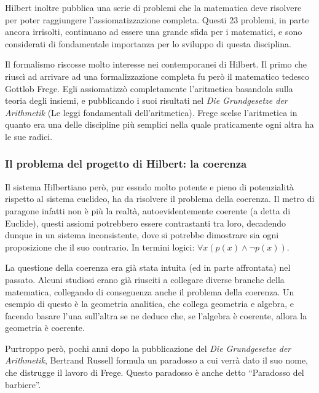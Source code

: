 \documentclass[a4paper,10pt]{article}
\begin{document}
Hilbert inoltre pubblica una serie di problemi che la matematica deve risolvere per poter raggiungere l'assiomatizzazione completa. Questi 23 problemi, in parte ancora irrisolti, continuano ad essere una grande sfida per i matematici, e sono considerati di fondamentale importanza per lo sviluppo di questa disciplina.

Il formalismo riscosse molto interesse nei contemporanei di Hilbert. Il primo che riuscì ad arrivare ad una formalizzazione completa fu però il matematico tedesco Gottlob Frege. Egli assiomatizzò completamente l'aritmetica basandola sulla teoria degli insiemi, e pubblicando i suoi risultati nel \textit{Die Grundgesetze der Arithmetik} (Le leggi fondamentali dell'aritmetica). Frege scelse l'aritmetica in quanto era una delle discipline più semplici nella quale praticamente ogni altra ha le sue radici.

\subsubsection[Il problema coerenza]{Il problema del progetto di Hilbert: la coerenza}
Il sistema Hilbertiano però, pur essndo molto potente e pieno di potenzialità rispetto al sistema euclideo, ha da risolvere il problema della coerenza. Il metro di paragone infatti non è più la realtà, autoevidentemente coerente (a detta di Euclide), questi assiomi potrebbero essere contrastanti tra loro, decadendo dunque in un sistema inconsistente, dove si potrebbe dimostrare sia ogni proposizione che il suo contrario. In termini logici: $ \forall x (p(x)\wedge\neg p(x))$.

La questione della coerenza era già stata intuita (ed in parte affrontata) nel passato. Alcuni studiosi erano già riusciti a collegare diverse branche della matematica, collegando di conseguenza anche il problema della coerenza. Un esempio di questo è la geometria analitica, che collega geometria e algebra, e facendo basare l'una sull'altra se ne deduce che, se l'algebra è coerente, allora la geometria è coerente.

Purtroppo però, pochi anni dopo la pubblicazione del \textit{Die Grundgesetze der Arithmetik}, Bertrand Russell formula un paradosso a cui verrà dato il suo nome, che distrugge il lavoro di Frege. Questo paradosso è anche detto “Paradosso del barbiere”.
\end{document}
